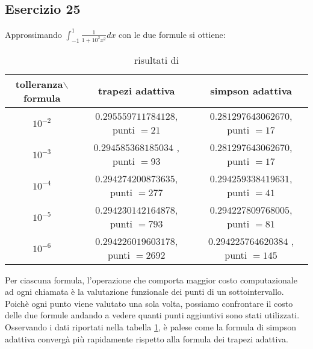 \subsection{Esercizio 25}


\newpage
Approssimando $\displaystyle \int_{-1}^{1}\frac{1}{1+10^2x^2}dx$ con le due formule si ottiene:
\begin{table}[h]
\begin{tabular}{|c |c |c|}
        \hline
        tolleranza$\backslash$formula & trapezi adattiva          &simpson adattiva\\
        \hline
        $10^{-2}$                     &$0.295559711784128$,  punti $= 21$      &$0.281297643062670$,  punti $= 17$  \\
        $10^{-3}$                     &$0.294585368185034$ , punti $= 93$     &$0.281297643062670$,  punti $= 17$  \\
        $10^{-4}$                     &$0.294274200873635$,  punti $= 277$      &$0.294259338419631$, punti $= 41$  \\
        $10^{-5}$                     &$0.294230142164878$, punti $= 793$      &$0.294227809768005$,  punti $= 81$  \\
        $10^{-6}$                     &$0.294226019603178$,  punti $= 2692$      &$0.294225764620384$ ,  punti $= 145$ \\
        \hline
    \end{tabular}
    \caption{risultati di }
    \label{tab:25}
\end{table}


Per ciascuna formula, l'operazione che comporta maggior costo computazionale ad ogni chiamata è la valutazione funzionale dei punti di un sottointervallo.
Poichè ogni punto viene valutato una sola volta, possiamo confrontare il costo delle due formule andando a vedere quanti punti aggiuntivi sono stati utilizzati.
Osservando i dati riportati nella tabella \ref{tab:25}, è palese come la formula di simpson adattiva convergà più rapidamente rispetto alla formula dei trapezi adattiva.
